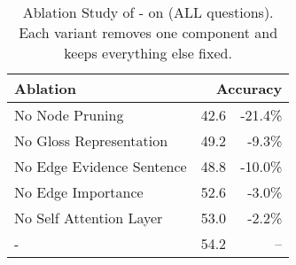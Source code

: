 \begin{table}[t]
  \centering
  \small
  \begin{tabular}{lrr}
    \textbf{Ablation}  & \multicolumn{2}{r}{\textbf{Accuracy}} \\ \toprule
    No Node Pruning & 42.6 & -21.4\% \\ 
    No Gloss Representation & 49.2 & -9.3\% \\ 
    No Edge Evidence Sentence & 48.8 & -10.0\% \\ 
    No Edge Importance & 52.6 & -3.0\% \\ 
    No Self Attention Layer & 53.0 & -2.2\% \\ 
    \name{}-\glove{} &54.2 & -- \\
    \bottomrule
  \end{tabular}
  \caption{Ablation Study of \name{}- on \qblink{} (ALL questions). 
    Each \name{} variant removes one component and keeps everything else fixed. }
    \label{tab:ablation} 
\end{table}
